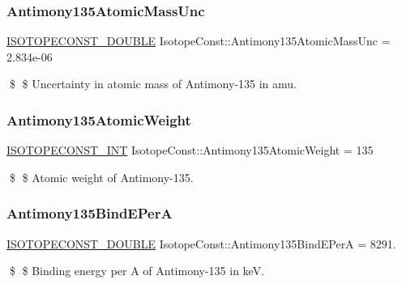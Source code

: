 \subsubsection{\texorpdfstring{Antimony135\+Atomic\+Mass\+Unc}{Antimony135AtomicMassUnc}}
{\footnotesize\ttfamily \mbox{\hyperlink{group___isotope_const-_macros_ga8f45a7272ce02c0b4c65c44636ed719a}{I\+S\+O\+T\+O\+P\+E\+C\+O\+N\+S\+T\+\_\+\+D\+O\+U\+B\+LE}} Isotope\+Const\+::\+Antimony135\+Atomic\+Mass\+Unc = 2.\+834e-\/06}

\$ \$ Uncertainty in atomic mass of Antimony-\/135 in amu. \mbox{\label{group___isotope_const-_antimony-_sb135_ga161e2316e483a482d87fed4866819d2d}} 
\subsubsection{\texorpdfstring{Antimony135\+Atomic\+Weight}{Antimony135AtomicWeight}}
{\footnotesize\ttfamily \mbox{\hyperlink{group___isotope_const-_macros_ga5f18360b3e99483a35c32d789e62621c}{I\+S\+O\+T\+O\+P\+E\+C\+O\+N\+S\+T\+\_\+\+I\+NT}} Isotope\+Const\+::\+Antimony135\+Atomic\+Weight = 135}

\$ \$ Atomic weight of Antimony-\/135. \mbox{\label{group___isotope_const-_antimony-_sb135_ga757ddfe3675b5d7753b4ac89871b84e8}} 
\subsubsection{\texorpdfstring{Antimony135\+Bind\+E\+PerA}{Antimony135BindEPerA}}
{\footnotesize\ttfamily \mbox{\hyperlink{group___isotope_const-_macros_ga8f45a7272ce02c0b4c65c44636ed719a}{I\+S\+O\+T\+O\+P\+E\+C\+O\+N\+S\+T\+\_\+\+D\+O\+U\+B\+LE}} Isotope\+Const\+::\+Antimony135\+Bind\+E\+PerA = 8291.}

\$ \$ Binding energy per A of Antimony-\/135 in keV. \mbox{\label{group___isotope_const-_antimony-_sb135_ga2e877478b8940d4083d35a8fa32972e3}} 
